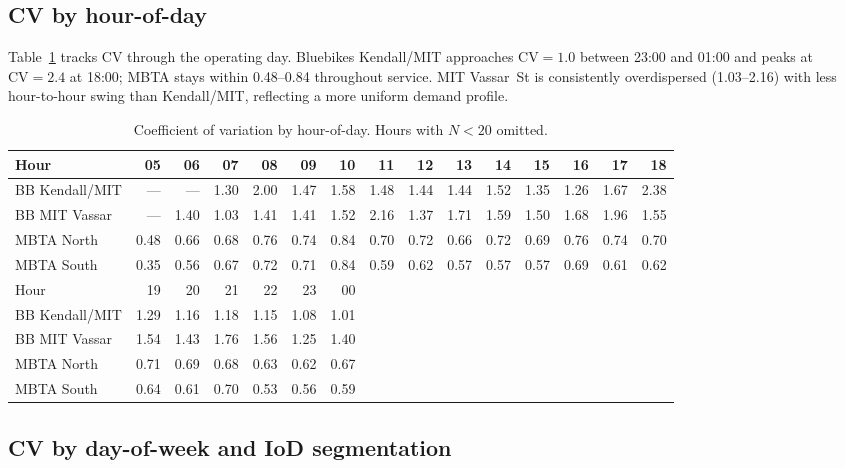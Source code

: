 \subsection{CV by hour-of-day}\label{app:hour}

Table~\ref{tab:cv-hour} tracks $\mathrm{CV}$ through the operating day. Bluebikes Kendall/MIT approaches $\mathrm{CV} = 1.0$ between 23:00 and 01:00 and peaks at $\mathrm{CV} = 2.4$ at 18:00; MBTA stays within 0.48--0.84 throughout service. MIT Vassar~St is consistently overdispersed (1.03--2.16) with less hour-to-hour swing than Kendall/MIT, reflecting a more uniform demand profile.

\begin{table}[h]
\centering
\caption{Coefficient of variation by hour-of-day. Hours with $N < 20$ omitted.}
\label{tab:cv-hour}
\footnotesize
\setlength{\tabcolsep}{3pt}
\begin{tabular}{@{}lrrrrrrrrrrrrrr@{}}
\toprule
Hour & 05 & 06 & 07 & 08 & 09 & 10 & 11 & 12 & 13 & 14 & 15 & 16 & 17 & 18 \\
\midrule
BB Kendall/MIT & --- & --- & 1.30 & 2.00 & 1.47 & 1.58 & 1.48 & 1.44 & 1.44 & 1.52 & 1.35 & 1.26 & 1.67 & 2.38 \\
BB MIT Vassar & --- & 1.40 & 1.03 & 1.41 & 1.41 & 1.52 & 2.16 & 1.37 & 1.71 & 1.59 & 1.50 & 1.68 & 1.96 & 1.55 \\
MBTA North & 0.48 & 0.66 & 0.68 & 0.76 & 0.74 & 0.84 & 0.70 & 0.72 & 0.66 & 0.72 & 0.69 & 0.76 & 0.74 & 0.70 \\
MBTA South & 0.35 & 0.56 & 0.67 & 0.72 & 0.71 & 0.84 & 0.59 & 0.62 & 0.57 & 0.57 & 0.57 & 0.69 & 0.61 & 0.62 \\
\midrule
Hour & 19 & 20 & 21 & 22 & 23 & 00 & & & & & & & & \\
\midrule
BB Kendall/MIT & 1.29 & 1.16 & 1.18 & 1.15 & 1.08 & 1.01 & & & & & & & & \\
BB MIT Vassar & 1.54 & 1.43 & 1.76 & 1.56 & 1.25 & 1.40 & & & & & & & & \\
MBTA North & 0.71 & 0.69 & 0.68 & 0.63 & 0.62 & 0.67 & & & & & & & & \\
MBTA South & 0.64 & 0.61 & 0.70 & 0.53 & 0.56 & 0.59 & & & & & & & & \\
\bottomrule
\end{tabular}
\end{table}

\subsection{CV by day-of-week and IoD segmentation}\label{app:dow}

